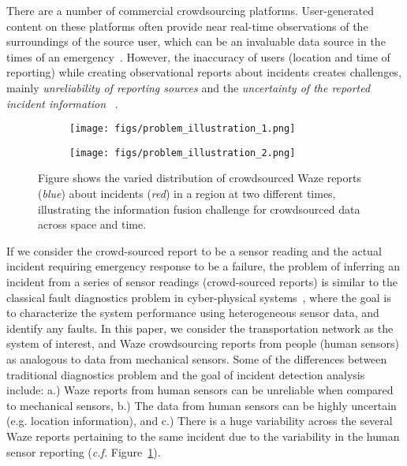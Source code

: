 \documentclass[conference]{IEEEtran}
\begin{document}
There are a number of commercial crowdsourcing platforms. 
User-generated content on these platforms often provide near real-time observations of the surroundings of the source user, which can be an invaluable data source in the times of an emergency~\cite{amin2018evaluating}. However, the  inaccuracy of users (location and time of reporting) while creating observational reports about incidents 
creates challenges, mainly \textit{unreliability of reporting sources} and the \textit{uncertainty of the reported incident information}
~\cite{lenkei2018crowdsourced}.  

\begin{figure}[t]
\centering
    \begin{subfigure}
      \centering
      \texttt{[image: figs/problem\_illustration\_1.png]}
    \end{subfigure} 
    \begin{subfigure}
      \centering
      \texttt{[image: figs/problem\_illustration\_2.png]}
    \end{subfigure}
\caption{Figure shows the varied distribution of crowdsourced Waze reports (\textit{blue}) about incidents (\textit{red}) in a region at two different times, illustrating the information fusion challenge for crowdsourced data across space and time. }
\label{fig:problem_illustration}
\end{figure}


If we consider the crowd-sourced report to be a sensor reading and the actual incident requiring emergency response to be a failure, the problem of inferring an incident from a series of sensor readings (crowd-sourced reports) is similar to the classical fault diagnostics problem in cyber-physical systems~\cite{abdelwahed2011model}, where the goal is to characterize the system performance using heterogeneous sensor data, and identify any faults. In this paper, we consider the transportation network as the system of interest, and Waze crowdsourcing reports from people (human sensors) as analogous to data from mechanical sensors. 
Some of the differences between traditional diagnostics problem and the goal of incident detection analysis include: 
a.) Waze reports from human sensors can be unreliable when compared to mechanical sensors, 
b.) The data from human sensors can be highly uncertain (e.g. location information), and 
c.) There is a huge variability across the several Waze reports pertaining to the same incident due to the variability in the human sensor reporting (\textit{c.f.} Figure~\ref{fig:problem_illustration}).
\end{document}
